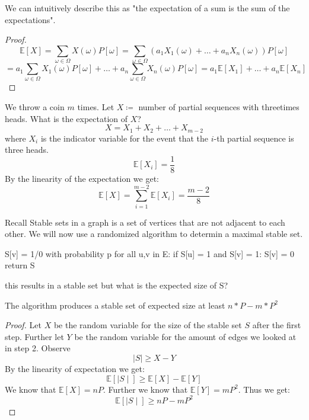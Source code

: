\begin{remark}
	We can intuitively describe this as "the expectation of a sum is the sum of the expectations".
\end{remark}

\begin{proof}
	$$\mathbb{E}[X] = \sum_{\omega \in \Omega} X(\omega) P[\omega] = \sum_{\omega \in \Omega} (a_1 X_1(\omega) + \dots + a_n X_n(\omega)) P[\omega]$$
	$$ = a_1 \sum_{\omega \in \Omega} X_1(\omega) P[\omega] + \dots + a_n \sum_{\omega \in \Omega} X_n(\omega) P[\omega] = a_1 \mathbb{E}[X_1] + \dots + a_n \mathbb{E}[X_n]$$
\end{proof}

\begin{example}
	We throw a coin $m$ times. Let $X \coloneqq$ number of partial sequences with threetimes heads. What is the expectation of $X$?
	$$X = X_1 + X_2 + \dots + X_{m-2}$$
	where $X_i$ is the indicator variable for the event that the $i$-th partial sequence is three heads.
	$$\mathbb{E}[X_i] = \frac{1}{8}$$
	By the linearity of the expectation we get:
	$$\mathbb{E}[X] = \sum_{i=1}^{m-2} \mathbb{E}[X_i] = \frac{m-2}{8}$$
\end{example}

\begin{remark}
	Recall Stable sets in a graph is a set of vertices that are not adjacent to each other. We will now use a randomized algorithm to determin a maximal stable set.
\end{remark}

\begin{algorithm}
	S[v] = 1/0 with probability p
	for all u,v in E:
	if S[u] = 1 and S[v] = 1:
	S[v] = 0
	return S
\end{algorithm}

this results in a stable set but what is the expected size of S?

\begin{theorem}
	The algorithm produces a stable set of expected size at least $n*P-m*P^2$
\end{theorem}

\begin{proof}
	Let $X$ be the random variable for the size of the stable set $S$ after the first step. Further let $Y$ be the random variable for the amount of edges we looked at in step 2. Observe
	$$\mid S \mid  \geq X - Y$$
	By the linearity of expectation we get:
	$$\mathbb{E}[\mid S \mid] \geq \mathbb{E}[X] - \mathbb{E}[Y]$$
	We know that $\mathbb{E}[X] = nP$. Further we know that $\mathbb{E}[Y] = mP^2$. Thus we get:
	$$\mathbb{E}[\mid S \mid] \geq nP - mP^2$$
\end{proof}

